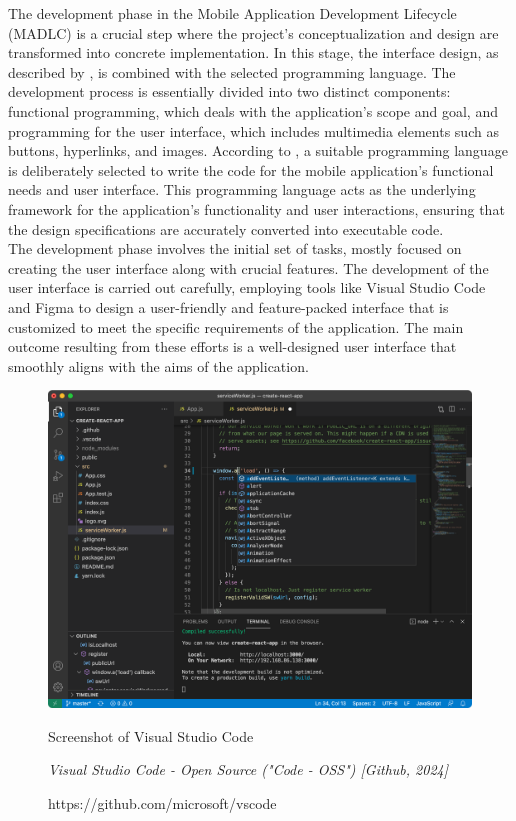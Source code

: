 The development phase in the Mobile Application Development Lifecycle (MADLC) is a crucial step where the project's conceptualization and design are transformed into concrete implementation. In this stage, the interface design, as described by \textcite{shanmugam19}, is combined with the selected programming language. The development process is essentially divided into two distinct components: functional programming, which deals with the application's scope and goal, and programming for the user interface, which includes multimedia elements such as buttons, hyperlinks, and images. According to \textcite{wambua23}, a suitable programming language is deliberately selected to write the code for the mobile application's functional needs and user interface. This programming language acts as the underlying framework for the application's functionality and user interactions, ensuring that the design specifications are accurately converted into executable code. \\

The development phase involves the initial set of tasks, mostly focused on creating the user interface along with crucial features. The development of the user interface is carried out carefully, employing tools like Visual Studio Code and Figma to design a user-friendly and feature-packed interface that is customized to meet the specific requirements of the application. The main outcome resulting from these efforts is a well-designed user interface that smoothly aligns with the aims of the application. \\

\begin{figure}[h]
    \centering
    \includegraphics[width=0.9\linewidth]{mainmatter/images/ssvisualstudio.png}
	\caption{Screenshot of Visual Studio Code}
    \caption*{\textit{Visual Studio Code - Open Source ("Code - OSS") [Github, 2024]}}
    \caption*{https://github.com/microsoft/vscode}
    \label{fig:myfig39}
\end{figure}

